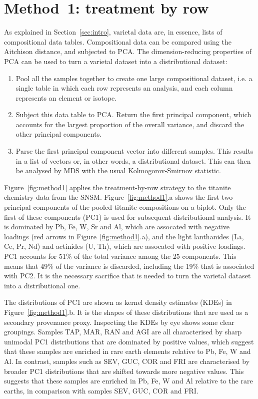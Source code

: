 \documentclass{article}
\begin{document}
\section{Method~1: treatment by row}\label{sec:method1}

As explained in Section~\ref{sec:intro}, varietal data are, in
essence, lists of compositional data tables. Compositional data can be
compared using the Aitchison distance, and subjected to PCA.  The
dimension-reducing properties of PCA can be used to turn a varietal
dataset into a distributional dataset:

\begin{enumerate}
\item Pool all the samples together to create one large compositional
  dataset, i.e. a single table in which each row represents an
  analysis, and each column represents an element or isotope.
\item Subject this data table to PCA. Return the first principal
  component, which accounts for the largest proportion of the overall
  variance, and discard the other principal components.
\item Parse the first principal component vector into different
  samples. This results in a list of vectors or, in other words, a
  distributional dataset. This can then be analysed by MDS with the
  usual Kolmogorov-Smirnov statistic.
\end{enumerate}

Figure~\ref{fig:method1} applies the treatment-by-row strategy to the
titanite chemistry data from the SNSM. Figure~\ref{fig:method1}.a
shows the first two principal components of the pooled titanite
compositions on a biplot. Only the first of these components (PC1) is
used for subsequent distributional analysis. It is dominated by Pb,
Fe, W, Sr and Al, which are assocated with negative loadings (red
arrows in Figure~\ref{fig:method1}.a), and the light lanthanides (La,
Ce, Pr, Nd) and actinides (U, Th), which are assocated with positive
loadings. PC1 accounts for 51\% of the total variance among the 25
components. This means that 49\% of the variance is discarded,
including the 19\% that is associated with PC2. It is the necessary
sacrifice that is needed to turn the varietal dataset into a
distributional one.\medskip

The distributions of PC1 are shown as kernel density estimates (KDEs)
in Figure~\ref{fig:method1}.b. It is the shapes of these distributions
that are used as a secondary provenance proxy. Inspecting the KDEs by
eye shows some clear groupings. Samples TAP, MAR, RAN and AGI are all
characterised by sharp unimodal PC1 distributions that are dominated
by positive values, which suggest that these samples are enriched in
rare earth elements relative to Pb, Fe, W and Al. In contrast, samples
such as SEV, GUC, COR and FRI are characterised by broader PC1
distributions that are shifted towards more negative values. This
suggests that these samples are enriched in Pb, Fe, W and Al relative
to the rare earths, in comparison with samples SEV, GUC, COR and
FRI.\medskip
\end{document}
